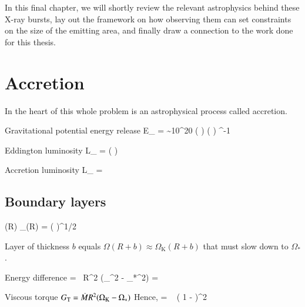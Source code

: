 In this final chapter, we will shortly review the relevant astrophysics behind these X-ray bursts, lay out the framework on how observing them can set constraints on the size of the emitting area, and finally draw a connection to the work done for this thesis.

\section{Accretion}

In the heart of this whole problem is an astrophysical process called accretion.

Gravitational potential energy release
\be
\Delta E_{} =  \sim 10^{20}  \left(  \right) \left(  \right) \unitspace\erg\unitspace\g^{-1}
\ee

Eddington luminosity
\be
L_{} =  \approx {} \left(  \right) \ergs
\ee

Accretion luminosity
\be
L_{} =  
\ee


\subsection{Boundary layers}

\be
\Omega(R) \approx \Omega_{}(R) = \left(  \right)^{1/2}
\ee

Layer of thickness $b$ equals $\Omega(R + b) \approx \Omega_{\mathrm{K}}(R + b)$ that must slow down to $\Omega_{*}$.

Energy difference
\be
{} =  \Mdot R^2 (\Omega_{}^2 - \Omega_{*}^2) = 
 \Mdot {}  
\ee

Viscous torque $G_{\mathrm{T}} = \dot{M} R^2 (\Omega_{\mathrm{K}} - \Omega_*)$
Hence,
\be
{} =   \left( 1 -  \right)^2
\ee





